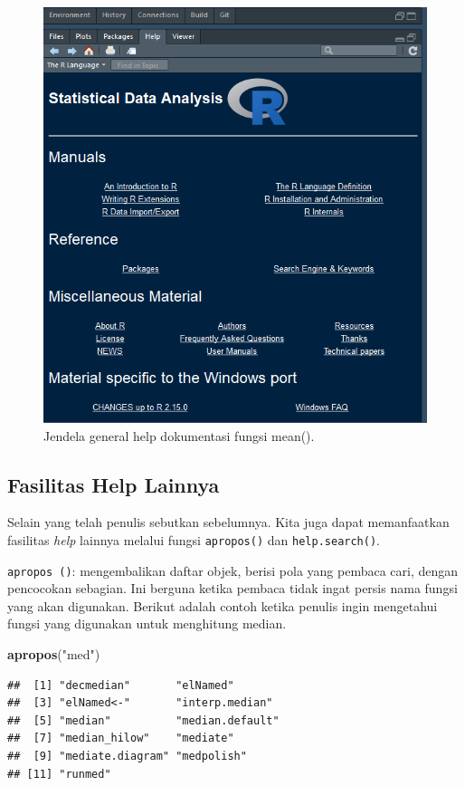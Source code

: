 \documentclass[]{book}
\newenvironment{Shaded}{\begin{snugshade}}{\end{snugshade}}
\newcommand{\KeywordTok}[1]{\textcolor[rgb]{0.13,0.29,0.53}{\textbf{#1}}}
\newcommand{\StringTok}[1]{\textcolor[rgb]{0.31,0.60,0.02}{#1}}
\newcommand{\NormalTok}[1]{#1}
\begin{document}
\begin{figure}

{\centering \includegraphics[width=0.5\linewidth]{generalhelp} 

}

\caption{Jendela general help dokumentasi fungsi mean().}\label{fig:generalhelp}
\end{figure}

\subsection{Fasilitas Help Lainnya}\label{fasilitas-help-lainnya}

Selain yang telah penulis sebutkan sebelumnya. Kita juga dapat
memanfaatkan fasilitas \emph{help} lainnya melalui fungsi
\texttt{apropos()} dan \texttt{help.search()}.

\texttt{apropos\ ()}: mengembalikan daftar objek, berisi pola yang
pembaca cari, dengan pencocokan sebagian. Ini berguna ketika pembaca
tidak ingat persis nama fungsi yang akan digunakan. Berikut adalah
contoh ketika penulis ingin mengetahui fungsi yang digunakan untuk
menghitung median.

\begin{Shaded}
\begin{Highlighting}[]
\KeywordTok{apropos}\NormalTok{(}\StringTok{"med"}\NormalTok{)}
\end{Highlighting}
\end{Shaded}

\begin{verbatim}
##  [1] "decmedian"       "elNamed"        
##  [3] "elNamed<-"       "interp.median"  
##  [5] "median"          "median.default" 
##  [7] "median_hilow"    "mediate"        
##  [9] "mediate.diagram" "medpolish"      
## [11] "runmed"
\end{verbatim}
\end{document}
